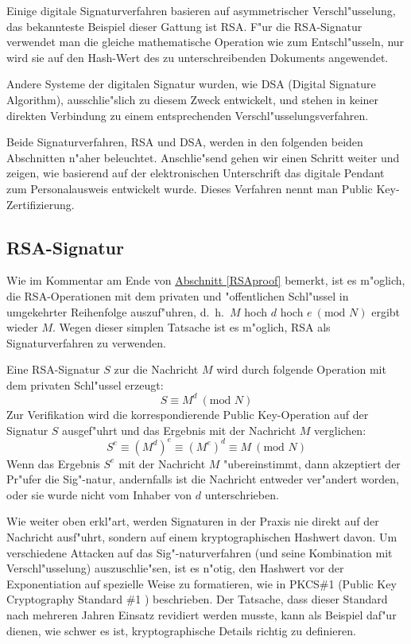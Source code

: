 Einige digitale Signaturverfahren basieren auf asymmetrischer
Verschl"usselung, das bekannteste Beispiel dieser Gattung ist RSA. F"ur die
RSA-Signatur verwendet man die gleiche mathematische Operation wie zum
Entschl"usseln, nur wird sie auf den Hash-Wert des zu unterschreibenden
Dokuments angewendet.

Andere Systeme der digitalen Signatur wurden, wie DSA (Digital Signature
Algorithm), ausschlie"slich zu diesem Zweck entwickelt, und stehen in
keiner direkten Verbindung zu einem entsprechenden
Verschl"usselungsverfahren.

Beide Signaturverfahren, RSA und DSA, werden in den folgenden beiden
Abschnitten n"aher beleuchtet. Anschlie"send gehen wir einen Schritt weiter
und zeigen, wie basierend auf der elektronischen Unterschrift das digitale
Pendant zum Personalausweis entwickelt wurde. Dieses Verfahren nennt man
Public Key-Zertifizierung.

\subsection{RSA-Signatur}

\def\Mod#1{\ (\mbox{mod }#1)}

Wie im Kommentar am Ende von \hyperlink{RSAproof}{Abschnitt
\ref{RSAproof}} bemerkt, ist es m"oglich, die RSA-Operationen mit dem
privaten und "offentlichen Schl"ussel in umgekehrter Reihenfolge auszuf"uhren,
d.~h.\ $M$ hoch $d$ hoch $e \Mod{N}$ ergibt wieder $M$. Wegen dieser
simplen Tatsache ist es m"oglich, RSA als Signaturverfahren zu
verwenden. 

Eine RSA-Signatur $S$ zur die Nachricht $M$ wird durch folgende Operation
mit dem privaten Schl"ussel erzeugt:
$$ S \equiv M^d \Mod{N} $$
Zur Verifikation wird die korrespondierende Public Key-Operation auf der
Signatur $S$ ausgef"uhrt und das Ergebnis mit der Nachricht $M$ verglichen:
$$
S^e \equiv (M^d)^e \equiv (M^e)^d \equiv M \Mod{N}$$
Wenn das Ergebnis
$S^e$ mit der Nachricht $M$ "ubereinstimmt, dann akzeptiert der Pr"ufer die
Sig"-natur, andernfalls ist die Nachricht entweder ver"andert worden, oder
sie wurde nicht vom Inhaber von $d$ unterschrieben.

Wie weiter oben erkl"art, werden Signaturen in der Praxis nie direkt auf der
Nachricht ausf"uhrt, sondern auf einem kryptographischen Hashwert davon. Um
verschiedene Attacken auf das Sig"-naturverfahren (und seine Kombination mit
Verschl"usselung) auszuschlie"sen, ist es n"otig, den Hashwert vor der
Exponentiation auf spezielle Weise zu formatieren, wie in PKCS\#1 (Public
Key Cryptography Standard \#1 \cite{PKCS1}) beschrieben. Der Tatsache, dass
dieser Standard nach mehreren Jahren Einsatz revidiert werden musste, kann
als Beispiel daf"ur dienen, wie schwer es ist, kryptographische Details
richtig zu definieren.

